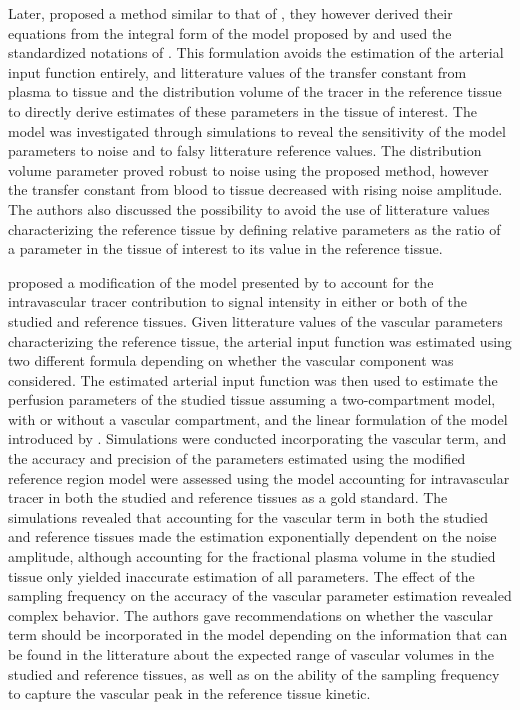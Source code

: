 Later, \citet{Yankeelov:2005dea} proposed a method similar to that of \citet{Kovar:1998bt}, they however derived their equations from the integral form of the model proposed by \citet{Kety:1951tp} and used the standardized notations of \citet{Tofts:1999ih}. 
This formulation avoids the estimation of the arterial input function entirely, and litterature values of the transfer constant from plasma to tissue and the distribution volume of the tracer in the reference tissue to directly derive estimates of these parameters in the tissue of interest.
The model was investigated through simulations to reveal the sensitivity of the model parameters to noise and to falsy litterature reference values.
The distribution volume parameter proved robust to noise using the proposed method, however the transfer constant from blood to tissue decreased with rising noise amplitude.
The authors also discussed the possibility to avoid the use of litterature values characterizing the reference tissue by defining relative parameters as the ratio of a parameter in the tissue of interest to its value in the reference tissue.

\citet{Faranesh:2008tt} proposed a modification of the model presented by \citet{Yankeelov:2005dea} to account for the intravascular tracer contribution to signal intensity in either or both of the studied and reference tissues.
Given litterature values of the vascular parameters characterizing the reference tissue, the arterial input function was estimated using two different formula depending on whether the vascular component was considered.
The estimated arterial input function was then used to estimate the perfusion parameters of the studied tissue assuming a two-compartment model, with or without a vascular compartment, and the linear formulation of the model introduced by \citet{Murase:2004kr}.
Simulations were conducted incorporating the vascular term, and the accuracy and precision of the parameters estimated using the modified reference region model were assessed using the model accounting for intravascular tracer in both the studied and reference tissues as a gold standard.
The simulations revealed that accounting for the vascular term in both the studied and reference tissues made the estimation exponentially dependent on the noise amplitude, although accounting for the fractional plasma volume in the studied tissue only yielded inaccurate estimation of all parameters.
The effect of the sampling frequency on the accuracy of the vascular parameter estimation revealed complex behavior.
The authors gave recommendations on whether the vascular term should be incorporated in the model depending on the information that can be found in the litterature about the expected range of vascular volumes in the studied and reference tissues, as well as on the ability of the sampling frequency to capture the vascular peak in the reference tissue kinetic.

